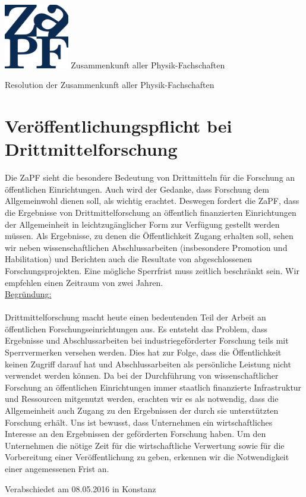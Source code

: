 \documentclass[DIV=calc]{scrartcl}
\begin{document}
\hspace{0.87\textwidth}
\begin{minipage}{120pt}
\vspace{-1.8cm}
\includegraphics[width=80pt]{logo.pdf}
\centering
\small Zusammenkunft aller Physik-Fachschaften
\end{minipage}
\begin{center}
\huge{Resolution der Zusammenkunft aller Physik-Fachschaften} \\
\normalsize
\end{center}

\vspace{1cm}
\section*{Ver\"offentlichungspflicht bei Drittmittelforschung}

Die ZaPF sieht die besondere Bedeutung von Drittmitteln für die Forschung an \"offentlichen Einrichtungen. Auch wird der Gedanke, dass Forschung dem Allgemeinwohl dienen soll, als wichtig erachtet. Deswegen fordert die ZaPF, dass die Ergebnisse von Drittmittelforschung an \"offentlich finanzierten Einrichtungen der Allgemeinheit in leichtzugänglicher Form zur Verfügung gestellt werden müssen. Als Ergebnisse, zu denen die \"Offentlichkeit Zugang erhalten soll, sehen wir neben wissenschaftlichen Abschlussarbeiten (insbesondere Promotion und Habilitation) und Berichten auch die Resultate von abgeschlossenen Forschungsprojekten. Eine m\"ogliche Sperrfrist muss zeitlich beschränkt sein. Wir empfehlen einen Zeitraum von zwei Jahren.\\

\underline{Begr\"undung:}\\\\
Drittmittelforschung macht heute einen bedeutenden Teil der Arbeit an \"offentlichen Forschungseinrichtungen aus. Es entsteht das Problem, dass Ergebnisse und Abschlussarbeiten bei industriegef\"orderter Forschung teils mit Sperrvermerken versehen werden. Dies hat zur Folge, dass die \"Offentlichkeit keinen Zugriff darauf hat und Abschlussarbeiten als pers\"onliche Leistung nicht verwendet werden k\"onnen. Da bei der Durchführung von wissenschaftlicher Forschung an \"offentlichen Einrichtungen immer staatlich finanzierte Infrastruktur und Ressourcen mitgenutzt werden, erachten wir es als notwendig, dass die Allgemeinheit auch Zugang zu den Ergebnissen der durch sie unterstützten Forschung erhält. Uns ist bewusst, dass Unternehmen ein wirtschaftliches Interesse an den Ergebnissen der gef\"orderten Forschung haben. Um den Unternehmen die n\"otige Zeit für die wirtschaftliche Verwertung sowie für die Vorbereitung einer Ver\"offentlichung zu geben, erkennen wir die Notwendigkeit einer angemessenen Frist an.

\vfill
\begin{flushright}
Verabschiedet am 08.05.2016 in Konstanz
\end{flushright}
\end{document}
